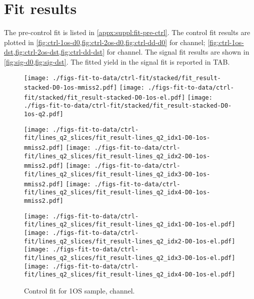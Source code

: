\section{Fit results}
\label{ref:fit:results}

The pre-control fit is listed in \cref{appx:suppl:fit-pre-ctrl}.
The control fit results are plotted in
\cref{fig:ctrl-1os-d0,fig:ctrl-2os-d0,fig:ctrl-dd-d0} for \Dz channel;
\cref{fig:ctrl-1os-dst,fig:ctrl-2os-dst,fig:ctrl-dd-dst} for \Dstar channel.
The signal fit results are shown in
\cref{fig:sig-d0,fig:sig-dst}.
The fitted yield in the signal fit is reported in TAB.


\begin{figure}[htb]
    \centering
    \texttt{[image: ./figs-fit-to-data/ctrl-fit/stacked/fit\_result-stacked-D0-1os-mmiss2.pdf]}
    \texttt{[image: ./figs-fit-to-data/ctrl-fit/stacked/fit\_result-stacked-D0-1os-el.pdf]}
    \texttt{[image: ./figs-fit-to-data/ctrl-fit/stacked/fit\_result-stacked-D0-1os-q2.pdf]}

    \texttt{[image: ./figs-fit-to-data/ctrl-fit/lines\_q2\_slices/fit\_result-lines\_q2\_idx1-D0-1os-mmiss2.pdf]}
    \texttt{[image: ./figs-fit-to-data/ctrl-fit/lines\_q2\_slices/fit\_result-lines\_q2\_idx2-D0-1os-mmiss2.pdf]}
    \texttt{[image: ./figs-fit-to-data/ctrl-fit/lines\_q2\_slices/fit\_result-lines\_q2\_idx3-D0-1os-mmiss2.pdf]}
    \texttt{[image: ./figs-fit-to-data/ctrl-fit/lines\_q2\_slices/fit\_result-lines\_q2\_idx4-D0-1os-mmiss2.pdf]}

    \texttt{[image: ./figs-fit-to-data/ctrl-fit/lines\_q2\_slices/fit\_result-lines\_q2\_idx1-D0-1os-el.pdf]}
    \texttt{[image: ./figs-fit-to-data/ctrl-fit/lines\_q2\_slices/fit\_result-lines\_q2\_idx2-D0-1os-el.pdf]}
    \texttt{[image: ./figs-fit-to-data/ctrl-fit/lines\_q2\_slices/fit\_result-lines\_q2\_idx3-D0-1os-el.pdf]}
    \texttt{[image: ./figs-fit-to-data/ctrl-fit/lines\_q2\_slices/fit\_result-lines\_q2\_idx4-D0-1os-el.pdf]}

    \caption{Control fit for 1OS sample, \Dz channel.}
    \label{fig:ctrl-1os-d0}
\end{figure}

